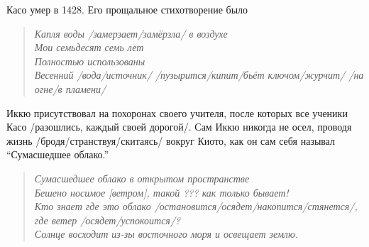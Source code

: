 \begin{ver}
  Касо умер в 1428. Его прощальное стихотворение было
\end{ver}

\begin{ver}
\begin{verse}\it
  Капля воды /замерзает/замёрзла/ в воздухе\\
  Мои семьдесят семь лет\\
  Полностью использованы\\
  Весенний /вода/источник/ /пузырится/кипит/бьёт ключом/журчит/ /на
  огне/в пламени/  
\end{verse}
\end{ver}

\begin{ver}
Иккю присутствовал на похоронах своего учителя, после которых все
ученики Касо /разошлись, каждый своей дорогой/.
Сам Иккю никогда не осел, проводя жизнь /бродя/странствуя/скитаясь/
вокруг Киото, как он сам себя называл ``Сумасшедшее облако.'' 
\end{ver}

\begin{ver}
  \begin{verse}\it
    Сумасшедшее облако в открытом пространстве\\
    Бешено носимое [ветром], такой ??? как только бывает!\\
    Кто знает где это облако
    /остановится/осядет/накопится/стянется/, где ветер
    /осядет/успокоится/?\\
    Солнце восходит из-зы восточного моря и освещает землю.
  \end{verse}
\end{ver}

